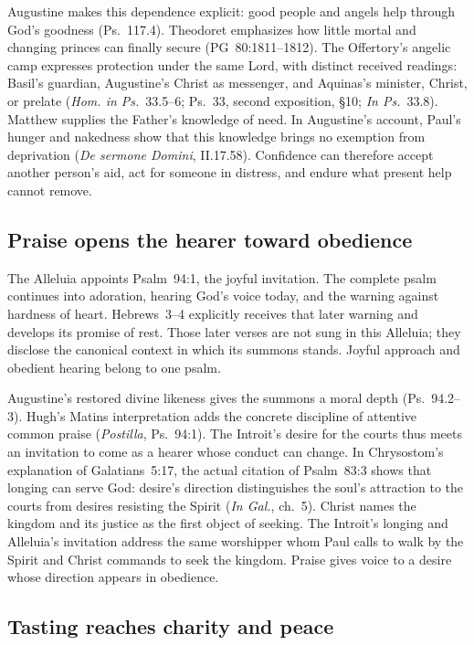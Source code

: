 Augustine makes this dependence explicit: good people and angels help through
God's goodness (Ps.~117.4). Theodoret emphasizes how little mortal and changing
princes can finally secure (PG~80:1811--1812). The Offertory's angelic camp
expresses protection under the same Lord, with distinct received readings:
Basil's guardian, Augustine's Christ as messenger, and Aquinas's minister,
Christ, or prelate (\emph{Hom. in Ps.}~33.5--6; Ps.~33, second exposition,
§10; \emph{In Ps.}~33.8). Matthew supplies the Father's knowledge of need.
In Augustine's account, Paul's hunger and nakedness show that this knowledge
brings no exemption from deprivation (\emph{De sermone Domini},
II.17.58). Confidence can therefore accept another person's aid, act for
someone in distress, and endure what present help cannot remove.

\subsection*{Praise opens the hearer toward obedience\enspace{}}

The Alleluia appoints Psalm~94:1, the joyful invitation. The complete psalm
continues into adoration, hearing God's voice today, and the warning against
hardness of heart. Hebrews~3--4 explicitly receives that later warning and
develops its promise of rest. Those later verses are not sung in this
Alleluia; they disclose the canonical context in which its summons stands.
Joyful approach and obedient hearing belong to one psalm.

Augustine's restored divine likeness gives the summons a moral depth
(Ps.~94.2--3). Hugh's Matins interpretation adds the concrete discipline of
attentive common praise (\emph{Postilla}, Ps.~94:1). The Introit's desire for
the courts thus meets an invitation to come as a hearer whose conduct can
change. In Chrysostom's explanation of Galatians~5:17, the actual citation of
Psalm~83:3 shows that longing can serve God: desire's direction distinguishes
the soul's attraction to the courts from desires resisting the Spirit
(\emph{In Gal.}, ch.~5). Christ names the kingdom and its justice as the
first object of seeking. The Introit's longing and Alleluia's invitation
address the same worshipper whom Paul calls to walk by the Spirit and Christ
commands to seek the kingdom. Praise gives voice to a desire whose direction
appears in obedience.

\subsection*{Tasting reaches charity and peace\enspace{}}

